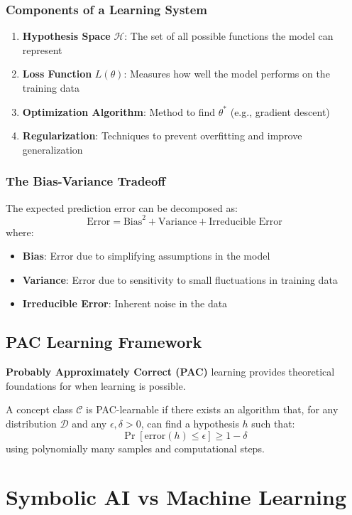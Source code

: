 \subsubsection{Components of a Learning System}
\begin{enumerate}
    \item \textbf{Hypothesis Space} \(\mathcal{H}\): The set of all possible functions the model can represent
    \item \textbf{Loss Function} \(L(\theta)\): Measures how well the model performs on the training data
    \item \textbf{Optimization Algorithm}: Method to find \(\theta^*\) (e.g., gradient descent)
    \item \textbf{Regularization}: Techniques to prevent overfitting and improve generalization
\end{enumerate}

\subsubsection{The Bias-Variance Tradeoff}
The expected prediction error can be decomposed as:
\[\text{Error} = \text{Bias}^2 + \text{Variance} + \text{Irreducible Error}\]
where:
\begin{itemize}
    \item \textbf{Bias}: Error due to simplifying assumptions in the model
    \item \textbf{Variance}: Error due to sensitivity to small fluctuations in training data
    \item \textbf{Irreducible Error}: Inherent noise in the data
\end{itemize}

\subsection{PAC Learning Framework}
\textbf{Probably Approximately Correct (PAC)} learning provides theoretical foundations for when learning is possible.

A concept class \(\mathcal{C}\) is PAC-learnable if there exists an algorithm that, for any distribution \(\mathcal{D}\) and any \(\epsilon, \delta > 0\), can find a hypothesis \(h\) such that:
\[\Pr[\text{error}(h) \leq \epsilon] \geq 1 - \delta\]
using polynomially many samples and computational steps.

\section{Symbolic AI vs Machine Learning}
